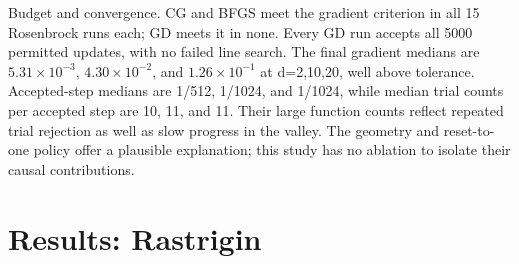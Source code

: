 \documentclass[10pt]{article}
\begin{document}
Budget and convergence. CG and BFGS meet the gradient criterion in all 15 Rosenbrock runs each; GD meets it in none. Every GD run accepts all 5000 permitted updates, with no failed line search. The final gradient medians are \(5.31\times10^{-3}\), \(4.30\times10^{-2}\), and \(1.26\times10^{-1}\) at d=2,10,20, well above tolerance. Accepted-step medians are 1/512, 1/1024, and 1/1024, while median trial counts per accepted step are 10, 11, and 11. Their large function counts reflect repeated trial rejection as well as slow progress in the valley. The geometry and reset-to-one policy offer a plausible explanation; this study has no ablation to isolate their causal contributions.


\newpage
\setcounter{section}{6}
\section{Results: Rastrigin}
\begingroup
\fontsize{8}{9.2}\selectfont
\setlength{\tabcolsep}{3pt}
\renewcommand{\arraystretch}{1.05}
\centering
\end{document}
